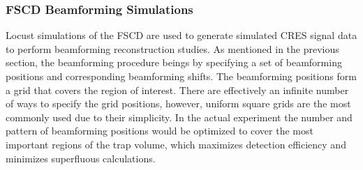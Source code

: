 \subsubsection*{FSCD Beamforming Simulations}

Locust simulations of the FSCD are used to generate simulated CRES signal data to perform beamforming reconstruction studies. As mentioned in the previous section, the beamforming procedure beings by specifying a set of beamforming positions and corresponding beamforming shifts. The beamforming positions form a grid that covers the region of interest. There are effectively an infinite number of ways to specify the grid positions, however, uniform square grids are the most commonly used due to their simplicity. In the actual experiment the number and pattern of beamforming positions would be optimized to cover the most important regions of the trap volume, which maximizes detection efficiency and minimizes superfluous calculations.

